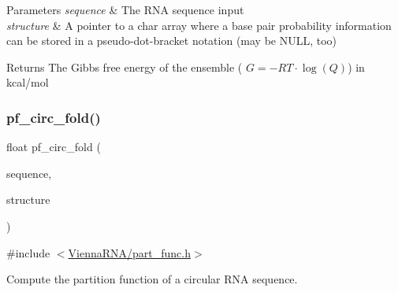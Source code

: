 \begin{DoxyParams}{Parameters}
{\em sequence} & The R\+NA sequence input \\
\hline
{\em structure} & A pointer to a char array where a base pair probability information can be stored in a pseudo-\/dot-\/bracket notation (may be N\+U\+LL, too) \\
\hline
\end{DoxyParams}
\begin{DoxyReturn}{Returns}
The Gibbs free energy of the ensemble ( $G = -RT \cdot \log(Q) $) in kcal/mol 
\end{DoxyReturn}
\mbox{\label{group__pf__fold_ga819ce5fca8984004ac81c4a3b04cb735}} 
\subsubsection{\texorpdfstring{pf\+\_\+circ\+\_\+fold()}{pf\_circ\_fold()}}
{\footnotesize\ttfamily float pf\+\_\+circ\+\_\+fold (\begin{DoxyParamCaption}\item[{const char $\ast$}]{sequence,  }\item[{char $\ast$}]{structure }\end{DoxyParamCaption})}



{\ttfamily \#include $<$\mbox{\hyperlink{part__func_8h}{Vienna\+R\+N\+A/part\+\_\+func.\+h}}$>$}



Compute the partition function of a circular R\+NA sequence. 

